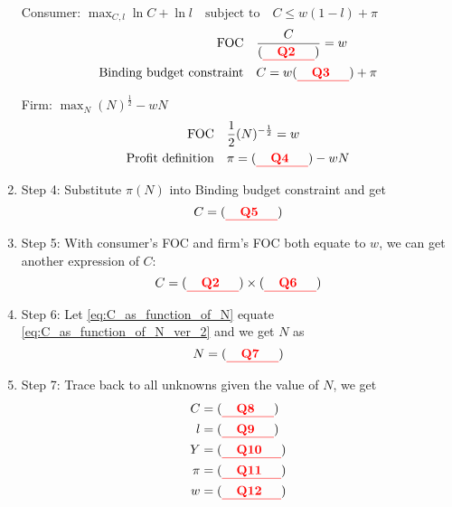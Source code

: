 \documentclass[14pt]{extarticle}
\newcommand{\red}[1]{\textcolor{red}{#1}}
\begin{document}
\begin{enumerate}
    Consumer: $ \max_{C, l} \ln C + \ln l \quad \text{subject to} \quad C \le w( 1-l ) + \pi $
    \begin{align}
        \text{FOC} \quad
            & \frac{C}{(\textbf{\red{\underline{\quad Q2 \quad}}})} = w
            \label{eq:consumerFOC}
        \\
        \text{Binding budget constraint} \quad
            & C = w (\textbf{\red{\underline{\quad Q3 \quad}}}) + \pi
            \label{eq:binding_budget}
    \end{align}

    Firm: $ \max_{N} ( N )^{\frac{1}{2}} - w N $
    \begin{align}
        \text{FOC} \quad
            & \frac{1}{2} ( N )^{- \frac{1}{2}} = w
            \label{eq:firmFOC}
        \\
        \text{Profit definition} \quad
            & \pi = (\textbf{\red{\underline{\quad Q4 \quad}}}) - w N
            \label{eq:profitDef}
    \end{align}
    \item Step 4: Substitute $ \pi( N ) $ into Binding budget constraint and get
    \begin{equation}
    \label{eq:C_as_function_of_N}
        C = (\textbf{\red{\underline{\quad Q5 \quad}}})
    \end{equation}
    \item Step 5: With consumer's FOC and firm's FOC both equate to $ w $, we can get another expression of $ C $:
    \begin{equation}
    \label{eq:C_as_function_of_N_ver_2}
        C = (\textbf{\red{\underline{\quad Q2 \quad}}}) \times  (\textbf{\red{\underline{\quad Q6 \quad}}})
    \end{equation}
    \item Step 6: Let \eqref{eq:C_as_function_of_N} equate \eqref{eq:C_as_function_of_N_ver_2} and we get $ N $ as
    \begin{equation}
    \label{eq:Nvalue}
        N = (\textbf{\red{\underline{\quad Q7 \quad}}})
    \end{equation}
    \item Step 7: Trace back to all unknowns given the value of $ N $, we get
    \begin{align}
        C
            & = (\textbf{\red{\underline{\quad Q8 \quad}}})
        \\
        l
            & = (\textbf{\red{\underline{\quad Q9 \quad}}})
        \\
        Y
            & = (\textbf{\red{\underline{\quad Q10 \quad}}})
        \\
        \pi
            & = (\textbf{\red{\underline{\quad Q11 \quad}}})
        \\
        w
            & = (\textbf{\red{\underline{\quad Q12 \quad}}})
    \end{align}


\end{enumerate}
\end{document}
